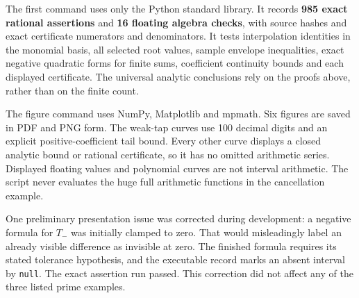 The first command uses only the Python standard library. It records
\textbf{985 exact rational assertions} and \textbf{16 floating algebra
checks}, with source hashes and exact certificate numerators and
denominators. It tests interpolation identities in the monomial basis,
all selected root values, sample envelope inequalities, exact negative
quadratic forms for finite sums, coefficient continuity bounds and each displayed
certificate. The universal analytic conclusions rely on the proofs
above, rather than on the finite count.

The figure command uses NumPy, Matplotlib and mpmath. Six figures are
saved in PDF and PNG form. The weak-tap curves use 100 decimal digits
and an explicit positive-coefficient tail bound. Every other curve
displays a closed analytic bound or rational certificate, so it has no
omitted arithmetic series. Displayed floating values and polynomial
curves are not interval arithmetic. The script never evaluates the huge
full arithmetic functions in the cancellation example.

One preliminary presentation issue was corrected during development: a
negative formula for \(T_-\) was initially clamped to zero. That would
misleadingly label an already visible difference as invisible at zero.
The finished formula requires its stated tolerance hypothesis, and the
executable record marks an absent interval by \texttt{null}. The exact
assertion run passed. This correction did not affect any of the three
listed prime examples.
